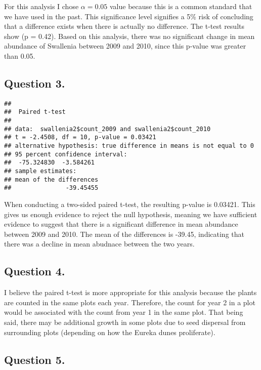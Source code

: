 \documentclass[]{article}
\begin{document}
For this analysis I chose \(\alpha = 0.05\) value because this is a
common standard that we have used in the past. This significance level
signifies a 5\% risk of concluding that a difference exists when there
is actually no difference. The t-test results show (p = 0.42). Based on
this analysis, there was no significant change in mean abundance of
Swallenia between 2009 and 2010, since this p-value was greater than
0.05.

\hypertarget{question-3.}{%
\subsection{Question 3.}\label{question-3.}}

\begin{verbatim}
## 
##  Paired t-test
## 
## data:  swallenia2$count_2009 and swallenia2$count_2010
## t = -2.4508, df = 10, p-value = 0.03421
## alternative hypothesis: true difference in means is not equal to 0
## 95 percent confidence interval:
##  -75.324830  -3.584261
## sample estimates:
## mean of the differences 
##               -39.45455
\end{verbatim}

When conducting a two-sided paired t-test, the resulting p-value is
0.03421. This gives us enough evidence to reject the null hypothesis,
meaning we have sufficient evidence to suggest that there is a
significant difference in mean abundance between 2009 and 2010. The mean
of the differences is -39.45, indicating that there was a decline in
mean abudnace between the two years.

\hypertarget{question-4.}{%
\subsection{Question 4.}\label{question-4.}}

I believe the paired t-test is more appropriate for this analysis
because the plants are counted in the same plots each year. Therefore,
the count for year 2 in a plot would be associated with the count from
year 1 in the same plot. That being said, there may be additional growth
in some plots due to seed dispersal from surrounding plots (depending on
how the Eureka dunes proliferate).

\hypertarget{question-5.}{%
\subsection{Question 5.}\label{question-5.}}
\end{document}
